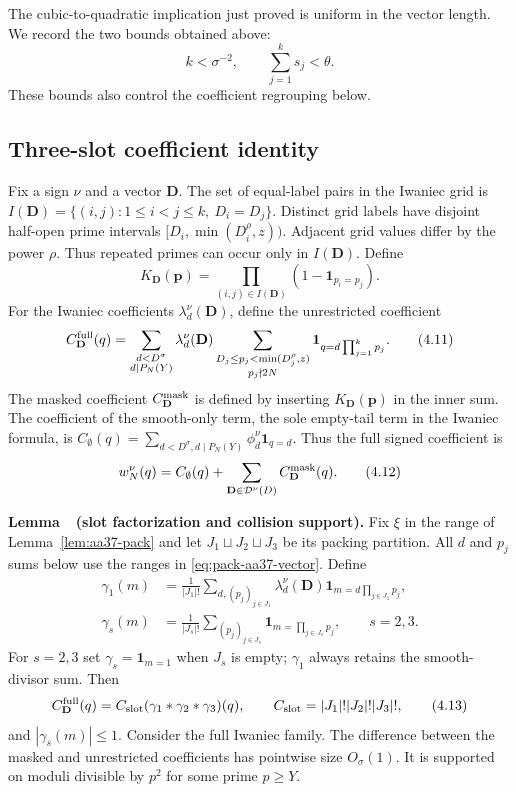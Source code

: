 The cubic-to-quadratic implication just proved is uniform in the vector
length. We record the two bounds obtained above:
\[
 k<\sigma^{-2},\qquad \sum_{j=1}^k s_j<\theta.
 \tag{4.10}\label{eq:pack-aa37-length}
\]
These bounds also control the coefficient regrouping below.

\subsection{Three-slot coefficient identity}

Fix a sign $\nu$ and a vector $\mathbf D$. The set of
equal-label pairs in the Iwaniec grid is
$I(\mathbf D)=\{(i,j):1\le i<j\le k,\ D_i=D_j\}$. Distinct grid labels have
disjoint half-open prime intervals
$[D_i,\min(D_i^\rho,z))$. Adjacent grid values differ by
the power $\rho$. Thus repeated primes can occur only in
$I(\mathbf D)$. Define
\[
 K_{\mathbf D}(\mathbf p)=
   \prod_{(i,j)\in I(\mathbf D)}(1-\mathbf1_{p_i=p_j}).
\]
For the Iwaniec coefficients $\lambda_d^\nu(\mathbf D)$, define the
unrestricted coefficient
\[
 C_{\mathbf D}^{\rm full}(q)=
 \sum_{\substack{d<D^\sigma\\d\mid P_N(Y)}}
 \lambda_d^\nu(\mathbf D)
 \sum_{\substack{D_j\le p_j<\min(D_j^\rho,z)\\p_j\nmid2N}}
 \mathbf1_{q=d\prod_{j=1}^k p_j}.
 \tag{4.11}\label{eq:pack-aa37-vector}
\]
The masked coefficient $C_{\mathbf D}^{\rm mask}$ is defined by
inserting $K_{\mathbf D}(\mathbf p)$ in the inner sum. The coefficient
of the smooth-only term, the sole empty-tail term in the Iwaniec formula,
is
$C_{\emptyset}(q)=\sum_{d<D^\sigma,d\mid P_N(Y)}
\phi_d^\nu\mathbf1_{q=d}$. Thus the full signed coefficient is
\[
 w_N^\nu(q)=C_{\emptyset}(q)+
       \sum_{\mathbf D\in\mathcal D^\nu(D)}
             C_{\mathbf D}^{\rm mask}(q).
 \tag{4.12}\label{eq:pack-aa37-weight}
\]

\textbf{Lemma~\thelemma\ (slot factorization and collision support).}\label{lem:aa37-slot}
Fix $\xi$ in
the range of Lemma~\ref{lem:aa37-pack} and let $J_1\sqcup J_2\sqcup J_3$ be its
packing partition. All $d$ and $p_j$ sums below use the ranges in
\eqref{eq:pack-aa37-vector}. Define
\[
\begin{aligned}
 \gamma_1(m)&=\frac1{|J_1|!}
    \sum_{d,(p_j)_{j\in J_1}}
       \lambda_d^\nu(\mathbf D)\mathbf1_{m=d\prod_{j\in J_1}p_j},\\
 \gamma_s(m)&=\frac1{|J_s|!}
    \sum_{(p_j)_{j\in J_s}}
       \mathbf1_{m=\prod_{j\in J_s}p_j},\qquad s=2,3.
\end{aligned}
\]
For $s=2,3$ set $\gamma_s=\mathbf1_{m=1}$ when $J_s$ is empty;
$\gamma_1$ always retains the smooth-divisor sum. Then
\[
 C_{\mathbf D}^{\rm full}(q)=C_{\rm slot}
       (\gamma_1*\gamma_2*\gamma_3)(q),\qquad
 C_{\rm slot}=|J_1|!|J_2|!|J_3|!,
 \tag{4.13}\label{eq:pack-aa37-slot-id}
\]
and $|\gamma_s(m)|\le1$. Consider the full Iwaniec family. The difference between the masked
and unrestricted coefficients has pointwise size $O_\sigma(1)$. It is
supported on moduli divisible by $p^2$ for some prime $p\ge Y$.

